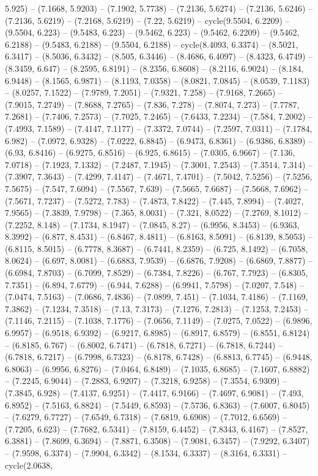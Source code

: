 5.925) -- (7.1668, 5.9203) -- (7.1902, 5.7738) -- (7.2136, 5.6274) -- (7.2136, 5.6246) -- (7.2136, 5.6219) -- (7.2168, 5.6219) -- (7.22, 5.6219) -- cycle(9.5504, 6.2209) -- (9.5504, 6.223) -- (9.5483, 6.223) -- (9.5462, 6.223) -- (9.5462, 6.2209) -- (9.5462, 6.2188) -- (9.5483, 6.2188) -- (9.5504, 6.2188) -- cycle(8.4093, 6.3374) -- (8.5021, 6.3417) -- (8.5036, 6.3432) -- (8.505, 6.3446) -- (8.4686, 6.4097) -- (8.4323, 6.4749) -- (8.3459, 6.647) -- (8.2595, 6.8191) -- (8.2356, 6.8608) -- (8.2116, 6.9024) -- (8.184, 6.9448) -- (8.1565, 6.9871) -- (8.1193, 7.0358) -- (8.0821, 7.0845) -- (8.0539, 7.1183) -- (8.0257, 7.1522) -- (7.9789, 7.2051) -- (7.9321, 7.258) -- (7.9168, 7.2665) -- (7.9015, 7.2749) -- (7.8688, 7.2765) -- (7.836, 7.278) -- (7.8074, 7.273) -- (7.7787, 7.2681) -- (7.7406, 7.2573) -- (7.7025, 7.2465) -- (7.6433, 7.2234) -- (7.584, 7.2002) -- (7.4993, 7.1589) -- (7.4147, 7.1177) -- (7.3372, 7.0744) -- (7.2597, 7.0311) -- (7.1784, 6.982) -- (7.0972, 6.9328) -- (7.0222, 6.8845) -- (6.9473, 6.8361) -- (6.9386, 6.8389) -- (6.93, 6.8416) -- (6.9275, 6.8516) -- (6.925, 6.8615) -- (7.0305, 6.9667) -- (7.136, 7.0718) -- (7.1923, 7.1332) -- (7.2487, 7.1945) -- (7.3001, 7.2543) -- (7.3514, 7.314) -- (7.3907, 7.3643) -- (7.4299, 7.4147) -- (7.4671, 7.4701) -- (7.5042, 7.5256) -- (7.5256, 7.5675) -- (7.547, 7.6094) -- (7.5567, 7.639) -- (7.5665, 7.6687) -- (7.5668, 7.6962) -- (7.5671, 7.7237) -- (7.5272, 7.783) -- (7.4873, 7.8422) -- (7.445, 7.8994) -- (7.4027, 7.9565) -- (7.3839, 7.9798) -- (7.365, 8.0031) -- (7.321, 8.0522) -- (7.2769, 8.1012) -- (7.2252, 8.148) -- (7.1734, 8.1947) -- (7.0845, 8.27) -- (6.9956, 8.3453) -- (6.9363, 8.3992) -- (6.877, 8.4531) -- (6.8467, 8.4811) -- (6.8163, 8.5091) -- (6.8139, 8.5053) -- (6.8115, 8.5015) -- (6.7778, 8.3687) -- (6.7441, 8.2359) -- (6.725, 8.1492) -- (6.7058, 8.0624) -- (6.697, 8.0081) -- (6.6883, 7.9539) -- (6.6876, 7.9208) -- (6.6869, 7.8877) -- (6.6984, 7.8703) -- (6.7099, 7.8529) -- (6.7384, 7.8226) -- (6.767, 7.7923) -- (6.8305, 7.7351) -- (6.894, 7.6779) -- (6.944, 7.6288) -- (6.9941, 7.5798) -- (7.0207, 7.548) -- (7.0474, 7.5163) -- (7.0686, 7.4836) -- (7.0899, 7.451) -- (7.1034, 7.4186) -- (7.1169, 7.3862) -- (7.1234, 7.3518) -- (7.13, 7.3173) -- (7.1276, 7.2813) -- (7.1253, 7.2453) -- (7.1146, 7.2115) -- (7.1038, 7.1776) -- (7.0656, 7.1149) -- (7.0275, 7.0522) -- (6.9896, 6.9957) -- (6.9518, 6.9392) -- (6.9217, 6.8985) -- (6.8917, 6.8579) -- (6.8551, 6.8124) -- (6.8185, 6.767) -- (6.8002, 6.7471) -- (6.7818, 6.7271) -- (6.7818, 6.7244) -- (6.7818, 6.7217) -- (6.7998, 6.7323) -- (6.8178, 6.7428) -- (6.8813, 6.7745) -- (6.9448, 6.8063) -- (6.9956, 6.8276) -- (7.0464, 6.8489) -- (7.1035, 6.8685) -- (7.1607, 6.8882) -- (7.2245, 6.9044) -- (7.2883, 6.9207) -- (7.3218, 6.9258) -- (7.3554, 6.9309) -- (7.3845, 6.928) -- (7.4137, 6.9251) -- (7.4417, 6.9166) -- (7.4697, 6.9081) -- (7.493, 6.8952) -- (7.5163, 6.8824) -- (7.5449, 6.8593) -- (7.5736, 6.8363) -- (7.6007, 6.8045) -- (7.6279, 6.7727) -- (7.6549, 6.7318) -- (7.6819, 6.6908) -- (7.7012, 6.6569) -- (7.7205, 6.623) -- (7.7682, 6.5341) -- (7.8159, 6.4452) -- (7.8343, 6.4167) -- (7.8527, 6.3881) -- (7.8699, 6.3694) -- (7.8871, 6.3508) -- (7.9081, 6.3457) -- (7.9292, 6.3407) -- (7.9598, 6.3374) -- (7.9904, 6.3342) -- (8.1534, 6.3337) -- (8.3164, 6.3331) -- cycle(2.0638, 